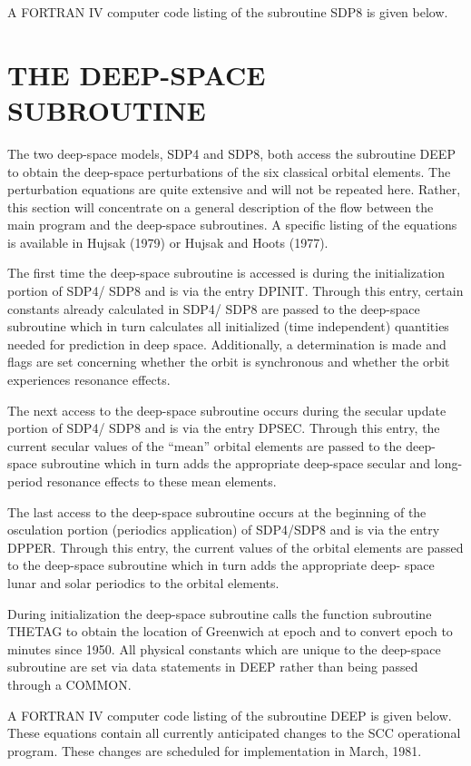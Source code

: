 A FORTRAN IV computer code listing of the subroutine SDP8 is given below.
\newpage

\newpage
\section[The Deep-Space Subroutine]{THE DEEP-SPACE SUBROUTINE}
The two deep-space models, SDP4 and SDP8, both access the subroutine DEEP to
obtain the deep-space perturbations of the six classical orbital elements.
The perturbation equations are quite extensive and will not be repeated here.
Rather, this section will concentrate on a general description of the flow
between the main program and the deep-space subroutines.  A specific listing
of the equations is available in Hujsak (1979) or Hujsak and Hoots (1977).

The first time the deep-space subroutine is accessed is during the
initialization portion of SDP4/ SDP8 and is via the entry DPINIT.  Through this
entry, certain constants already calculated in SDP4/ SDP8 are passed to the
deep-space subroutine which in turn calculates all initialized (time
independent) quantities needed for prediction in deep space.  Additionally, a
determination is made and flags are set concerning whether the orbit is
synchronous and whether the orbit experiences resonance effects.

The next access to the deep-space subroutine occurs during the secular update
portion of SDP4/ SDP8 and is via the entry DPSEC.  Through this entry, the
current secular values of the ``mean'' orbital elements are passed to the
deep-space subroutine which in turn adds the appropriate deep-space secular
and long-period resonance effects to these mean elements.

The last access to the deep-space subroutine occurs at the beginning of the
osculation portion (periodics application) of SDP4/SDP8 and is via the entry
DPPER.  Through this entry, the current values of the orbital elements are
passed to the deep-space subroutine which in turn adds the appropriate deep-
space lunar and solar periodics to the orbital elements.

During initialization the deep-space subroutine calls the function subroutine
THETAG to obtain the location of Greenwich at epoch and to convert epoch to
minutes since 1950.  All physical constants which are unique to the deep-space
subroutine are set via data statements in DEEP rather than being passed
through a COMMON.

A FORTRAN IV computer code listing of the subroutine DEEP is given below.
These equations contain all currently anticipated changes to the SCC
operational program.  These changes are scheduled for implementation in March,
1981.
\newpage

\newpage

